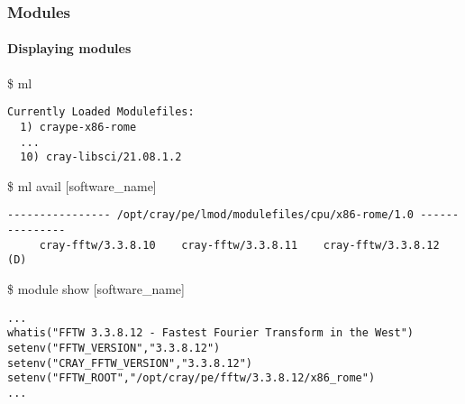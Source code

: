 \begin{frame}[fragile]
\frametitle{Modules }
\framesubtitle{Displaying modules}
\begin{exampleblock}{\$ ml}
\scriptsize
\begin{verbatim}
Currently Loaded Modulefiles:
  1) craype-x86-rome
  ...
  10) cray-libsci/21.08.1.2
\end{verbatim}
\end{exampleblock}

\begin{exampleblock}{\$ ml avail [software\_name]}
\scriptsize
\begin{verbatim}
---------------- /opt/cray/pe/lmod/modulefiles/cpu/x86-rome/1.0 ---------------
     cray-fftw/3.3.8.10    cray-fftw/3.3.8.11    cray-fftw/3.3.8.12 (D)
\end{verbatim}
\end{exampleblock}

\begin{exampleblock}{\$ module show [software\_name]}
\scriptsize
\begin{verbatim}
...
whatis("FFTW 3.3.8.12 - Fastest Fourier Transform in the West")
setenv("FFTW_VERSION","3.3.8.12")
setenv("CRAY_FFTW_VERSION","3.3.8.12")
setenv("FFTW_ROOT","/opt/cray/pe/fftw/3.3.8.12/x86_rome")
...
\end{verbatim}
\end{exampleblock}
\end{frame}

